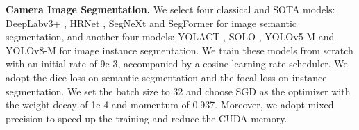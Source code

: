 \documentclass[lettersize,journal]{IEEEtran}
\begin{document}
\textbf{Camera Image Segmentation.} We select four classical and SOTA models: DeepLabv3+ \cite{chen2018encoder}, HRNet \cite{wang2020deep}, SegNeXt \cite{guo2022segnext} and SegFormer \cite{xie2021segformer} for image semantic segmentation, and another four models: YOLACT \cite{bolya2019yolact}, SOLO \cite{wang2020solo}, YOLOv5-M \cite{yolov5} and YOLOv8-M \cite{yolov8} for image instance segmentation. We train these models from scratch with an initial rate of 9e-3, accompanied by a cosine learning rate scheduler. We adopt the dice loss on semantic segmentation and the focal loss on instance segmentation. We set the batch size to 32 and choose SGD as the optimizer with the weight decay of 1e-4 and momentum of 0.937. Moreover, we adopt mixed precision to speed up the training and reduce the CUDA memory.  
\end{document}
